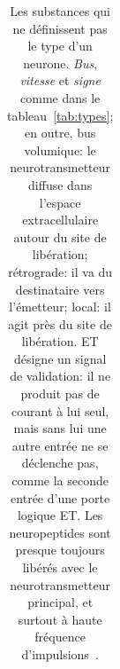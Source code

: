 \begin{table}[t]
\begin{tabular}{>{\raggedright}p{2.25cm}>{\raggedright}p{2.8cm}>{\raggedright}p{1.8cm}>{\raggedright}p{1.5cm}>{\centering}p{0.8cm}>{\raggedright\arraybackslash}p{4.3cm}}
\bottomrule
\end{tabular}
\caption{Les substances qui ne définissent pas le type d'un neurone. \emph{Bus}, \emph{vitesse} et \emph{signe} comme dans le tableau~\ref{tab:types}; en outre, bus volumique: le neurotransmetteur diffuse dans l'espace extracellulaire autour du site de libération; rétrograde: il va du destinataire vers l'émetteur; local: il agit près du site de libération. \og ET\fg{} désigne un signal de validation: il ne produit pas de courant à lui seul, mais sans lui une autre entrée ne se déclenche pas, comme la seconde entrée d'une porte logique ET. Les neuropeptides sont presque toujours libérés avec le neurotransmetteur principal, et surtout à haute fréquence d'impulsions~\cite{vandenPol2012}.}
\label{tab:othermediators}
\end{table}
